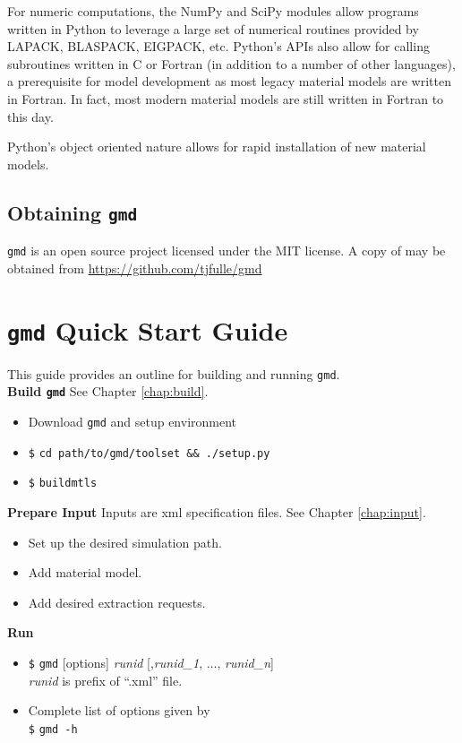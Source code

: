 \documentclass[11pt]{report}
\newcommand{\gmd}{\texttt{gmd}}
\newcommand{\prompt}{\texttt{\$}}
\newcommand{\boldnoindent}[1]{\noindent\textbf{#1}}
\begin{document}
For numeric computations, the NumPy and SciPy modules allow programs written
in Python to leverage a large set of numerical routines provided by LAPACK,
BLASPACK, EIGPACK, etc. Python's APIs also allow for calling subroutines
written in C or Fortran (in addition to a number of other languages), a
prerequisite for model development as most legacy material models are written
in Fortran. In fact, most modern material models are still written in Fortran
to this day.

Python's object oriented nature allows for rapid installation of new material
models.

\section{Obtaining \gmd{}}
\gmd{} is an open source project licensed under the MIT license. A copy of may
be obtained from \url{https://github.com/tjfulle/gmd}

\chapter{\gmd{} Quick Start Guide}
This guide provides an outline for building and running \gmd.\\[3pt]

\boldnoindent{Build \gmd{}} See Chapter \ref{chap:build}.
\begin{itemize}
  \item Download \gmd{} and setup environment
  \item \prompt{} \texttt{cd path/to/gmd/toolset \&\& ./setup.py}
  \item \prompt{} \texttt{buildmtls}
\end{itemize}

\boldnoindent{Prepare Input} Inputs are xml specification files. See Chapter
\ref{chap:input}.
\begin{itemize}
  \item Set up the desired simulation path.
  \item Add material model.
  \item Add desired extraction requests.
\end{itemize}

\boldnoindent{Run}
\begin{itemize}
  \item \prompt{} \gmd{} [options] \emph{runid} [,\emph{runid\_1}, $\ldots$,
  \emph{runid\_n}]\\
  \emph{runid} is prefix of ``.xml'' file.
  \item Complete list of options given by \\ \prompt{} \texttt{gmd -h}
\end{itemize}
\end{document}
